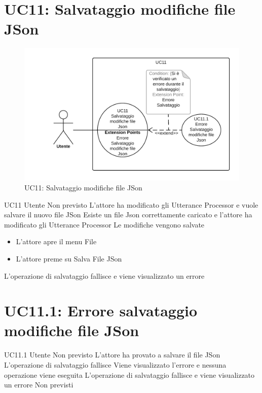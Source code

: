 \documentclass[../AnalisideiRequisiti.tex]{subfiles}
\begin{document}
\section{UC11: Salvataggio modifiche file JSon}
\begin{figure}[H]
	\centering
	\includegraphics[width=\textwidth]{../img/UC11.png}
	\caption{UC11: Salvataggio modifiche file JSon}
\end{figure}
\UserCase
{UC11}
{Utente}
{Non previsto}
{L'attore ha modificato gli Utterance Processor e vuole salvare il nuovo file JSon}
{Esiste un file Json correttamente caricato  e l'attore ha modificato gli Utterance Processor  }
{Le modifiche vengono salvate}
{
	\begin{itemize}
		\item{} L'attore apre il menu File 
		\item{} L'attore preme su Salva File JSon
	\end{itemize}
}
{L'operazione di salvataggio fallisce e viene visualizzato un errore }

\section{UC11.1: Errore salvataggio modifiche file JSon}
\UserCase
{UC11.1}
{Utente}
{Non previsto}
{L'attore ha provato a salvare il file JSon}
{L'operazione di salvataggio fallisce}
{Viene visualizzato l'errore e nessuna operazione viene eseguita}
{L'operazione di salvataggio fallisce e viene visualizzato un errore}
{Non previsti}
\end{document}
